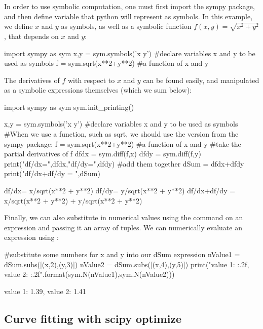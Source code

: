 In order to use symbolic computation, one must first import the sympy package, and then define variable that python will represent as symbols. In this example, we define $x$ and $y$ as symbols, as well as a symbolic function $f(x,y)=\sqrt{x^2+y^2}$, that depends on $x$ and $y$:

\begin{python}[caption = \mbox{}]
import sympy as sym
x,y = sym.symbols('x y')  #declare variables x and y to be used as symbols
f = sym.sqrt(x**2+y**2) #a function of x and y
\end{python}

The derivatives of $f$ with respect to $x$ and $y$ can be found easily, and manipulated as a symbolic expressions themselves (which we sum below):
\begin{python}[caption = \mbox{}]
import sympy as sym
sym.init_printing()

x,y = sym.symbols('x y')  #declare variables x and y to be used as symbols
#When we use a function, such as sqrt, we should use the version from the sympy package:
f = sym.sqrt(x**2+y**2) #a function of x and y
#take the partial derivatives of f
dfdx = sym.diff(f,x)
dfdy = sym.diff(f,y)
print("df/dx=",dfdx,"df/dy=",dfdy)
#add them together
dSum = dfdx+dfdy
print("df/dx+df/dy = ",dSum)
\end{python}
\begin{poutput}
df/dx= x/sqrt(x**2 + y**2) df/dy= y/sqrt(x**2 + y**2)
df/dx+df/dy =  x/sqrt(x**2 + y**2) + y/sqrt(x**2 + y**2)
\end{poutput}

Finally, we can also substitute in numerical values using the  command on an expression and passing it an array of tuples. We can numerically evaluate an expression using :
\begin{python}[caption = \mbox{}]
#substitute some numbers for x and y into our dSum expression
nValue1 = dSum.subs([(x,2),(y,3)])
nValue2 = dSum.subs([(x,4),(y,5)])
print("value 1: {:.2f}, value 2: {:.2f}".format(sym.N(nValue1),sym.N(nValue2)))
\end{python}
\begin{poutput}
value 1: 1.39, value 2: 1.41
\end{poutput}

\subsection{Curve fitting with scipy optimize}


